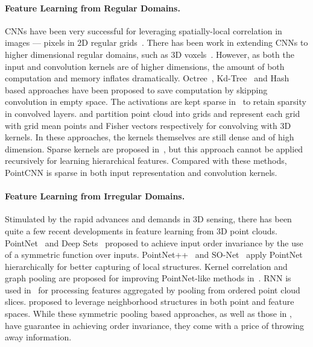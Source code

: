 \documentclass{article}
\begin{document}
\paragraph{Feature Learning from Regular Domains.} CNNs have been very successful for leveraging spatially-local correlation in images --- pixels in 2D regular grids~\cite{lecun1998gradient}. There has been work in extending CNNs to higher dimensional regular domains, such as 3D voxels~\cite{Wu_CVPR15}. However, as both the input and convolution kernels are of higher dimensions, the amount of both computation and memory inflates dramatically. Octree~\cite{Riegler_CVPR17,Wang_SIGGRAPH17}, Kd-Tree~\cite{Klokov_ICCV17} and Hash~\cite{Shao_arXiv18} based approaches have been proposed to save computation by skipping convolution in empty space. The activations are kept sparse in~\cite{SubmanifoldSparseConvNet} to retain sparsity in convolved layers. \cite{Hua_CVPR18} and \cite{BenShabat_arXiv18} partition point cloud into grids and  represent each grid with grid mean points and Fisher vectors respectively for convolving with 3D kernels. In these approaches, the kernels themselves are still dense and of high dimension. Sparse kernels are proposed in~\cite{Li_NIPS16}, but this approach cannot be applied recursively for learning hierarchical features. Compared with these methods, PointCNN is sparse in both input representation and convolution kernels.

\paragraph{Feature Learning from Irregular Domains.} Stimulated by the rapid advances and demands in 3D sensing, there has been quite a few recent developments in feature learning from 3D point clouds. PointNet~\cite{Qi_CVPR17} and Deep Sets~\cite{Zaheer_NIPS17} proposed to achieve input order invariance by the use of a symmetric function over inputs. PointNet++~\cite{Qi_NIPS17} and SO-Net~\cite{Li_CVPR18} apply PointNet hierarchically for better capturing of local structures. Kernel correlation and graph pooling are proposed for improving PointNet-like methods in~\cite{Shen_CVPR18}. RNN is used in~\cite{Huang_CVPR18} for processing features aggregated by pooling from ordered point cloud slices. \cite{Wang_arXiv18_mit} proposed to leverage neighborhood structures in both point and feature spaces. While these symmetric pooling based approaches, as well as those in \cite{Dieleman_ICML16,Zaheer_NIPS17,ravanbakhsh2016deep}, have guarantee in achieving order invariance, they come with a price of throwing away information.
\end{document}
